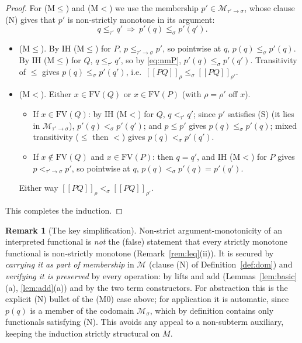 \documentclass{amsart}
\theoremstyle{definition}
\newtheorem{remark}{Remark}
\newcommand{\interp}[1]{[\![#1]\!]}
\newcommand{\FV}{\mathrm{FV}}
\begin{document}
\begin{proof}
For (M$\le$) and (M$<$) we use the membership $p'\in\mathcal M_{\tau'\to\sigma}$, whose
clause (N) gives that $p'$ is non-strictly monotone in its argument:
\begin{equation}\label{eq:nmP}
  q\le_{\tau'}q'\ \Longrightarrow\ p'(q)\le_\sigma p'(q').
\end{equation}
\begin{itemize}
\item (M$\le$). By IH \textup{(M$\le$)} for $P$, $p\le_{\tau'\to\sigma}p'$, so pointwise at
  $q$, $p(q)\le_\sigma p'(q)$. By IH \textup{(M$\le$)} for $Q$, $q\le_{\tau'}q'$, so by
  \eqref{eq:nmP}, $p'(q)\le_\sigma p'(q')$. Transitivity of $\le$ gives
  $p(q)\le_\sigma p'(q')$, i.e.\ $\interp{PQ}_\rho\le_\sigma\interp{PQ}_{\rho'}$.
\item (M$<$). Either $x\in\FV(Q)$ or $x\in\FV(P)$ (with $\rho=\rho'$ off $x$).
  \begin{itemize}
  \item If $x\in\FV(Q)$: by IH \textup{(M$<$)} for $Q$, $q<_{\tau'}q'$; since $p'$ satisfies
    (S) (it lies in $\mathcal M_{\tau'\to\sigma}$), $p'(q)<_\sigma p'(q')$; and $p\le p'$
    gives $p(q)\le_\sigma p'(q)$; mixed transitivity ($\le$ then $<$) gives
    $p(q)<_\sigma p'(q')$.
  \item If $x\notin\FV(Q)$ and $x\in\FV(P)$: then $q=q'$, and IH \textup{(M$<$)} for $P$
    gives $p<_{\tau'\to\sigma}p'$, so pointwise at $q$, $p(q)<_\sigma p'(q)=p'(q')$.
  \end{itemize}
  Either way $\interp{PQ}_\rho<_\sigma\interp{PQ}_{\rho'}$.
\end{itemize}
This completes the induction.
\end{proof}

\begin{remark}[The key simplification]\label{rem:keyfix}
Non-strict argument-monotonicity of an interpreted functional is \emph{not} the (false)
statement that every strictly monotone functional is non-strictly monotone
(Remark~\ref{rem:leq}(ii)). It is secured by \emph{carrying it as part of membership} in
$\mathcal M$ (clause (N) of Definition~\ref{def:dom}) and \emph{verifying it is preserved}
by every operation: by lifts and $\mathrm{add}$ (Lemmas~\ref{lem:basic}(a),
\ref{lem:add}(a)) and by the two term constructors. For abstraction this is the explicit
(N) bullet of the (M0) case above; for application it is automatic, since $p(q)$ is a member
of the codomain $\mathcal M_\sigma$, which by definition contains only functionals satisfying
(N). This avoids any appeal to a non-subterm auxiliary, keeping the induction strictly
structural on $M$.
\end{remark}
\end{document}
